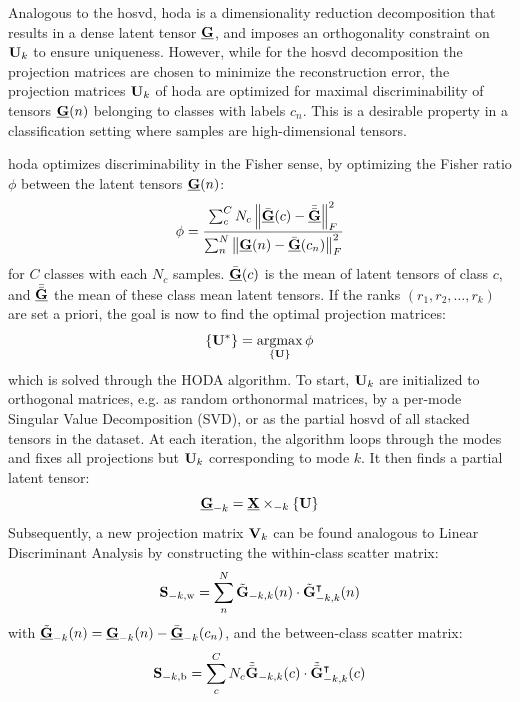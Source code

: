 \documentclass[10pt]{iopart}
\begin{document}
Analogous to the \ac{hosvd}, \ac{hoda} is a dimensionality
reduction decomposition that results in a dense latent tensor $\ten{G}$, and
imposes an orthogonality constraint on $\mat{U}_k$ to ensure uniqueness.
However, while for the \ac{hosvd} decomposition the projection matrices
are chosen to minimize the reconstruction error, the projection matrices
$\mat{U}_k$ of \ac{hoda} are optimized for maximal discriminability of tensors
$\ten{G}(n)$ belonging to classes with labels $c_n$.
This is a desirable property in a classification setting where samples are
high-dimensional tensors.

\Ac{hoda} optimizes discriminability in the Fisher sense, by optimizing the
Fisher ratio $\phi$ between the latent tensors $\ten{G}(n)$:
\begin{equation}
	\phi = \frac{\sum_c^CN_c\left\|\bar{\ten{G}}(c)-\bar{\bar{\ten{G}}}\right\|_F^2}
	{\sum_n^N\left\|\ten{G}(n)-\bar{\ten{G}}(c_n)\right\|_F^2}
	\label{eq:fisher}
\end{equation}
for $C$ classes with each $N_c$ samples. $\bar{\ten{G}}(c)$ is the mean of
latent tensors of class $c$, and $\bar{\bar{\ten{G}}}$ the mean of
these class mean latent tensors.
If the ranks $(r_1,r_2, \ldots,r_k)$ are set a priori, the goal is now to find the optimal projection matrices:
\begin{equation}
	\left\{\mat{U}^*\right\} = \argmax_{\{\mat{U}\}}\phi
\end{equation}
which is solved through the HODA algorithm.
To start, $\mat{U}_k$ are initialized to orthogonal matrices, e.g. as random
orthonormal matrices, by a per-mode Singular Value Decomposition (SVD),
or as the partial \ac{hosvd} of all stacked tensors in the dataset.
At each iteration, the algorithm loops through the modes and fixes all
projections but $\mat{U}_k$ corresponding to mode $k$.
It then finds a partial latent tensor:
\begin{equation}
	\ten{G}_{-k}=\ten{X}\mmprs{\mat{U}}{k}
\end{equation}
Subsequently, a new projection matrix $\mat{V}_k$ can be found analogous to Linear
Discriminant Analysis by constructing the within-class scatter matrix:
\begin{equation}
	\mat{S}_{-k,\text{w}} = \sum_n^N\tilde{\mat{G}}_{-k,k}(n)\cdot\tilde{\mat{G}}_{-k,k}^\intercal(n)
\end{equation}
with $\tilde{\ten{G}}_{-k}(n) = \ten{G}_{-k}(n) - \bar{\ten{G}}_{-k}(c_n)$,
and the between-class scatter matrix:
\begin{equation}
	\mat{S}_{-k,\text{b}} =
	\sum_c^CN_c\tilde{\bar{\mat{G}}}_{-k,k}(c)\cdot\tilde{\bar{\mat{G}}}_{-k,k}^\intercal(c)
\end{equation}
\end{document}
